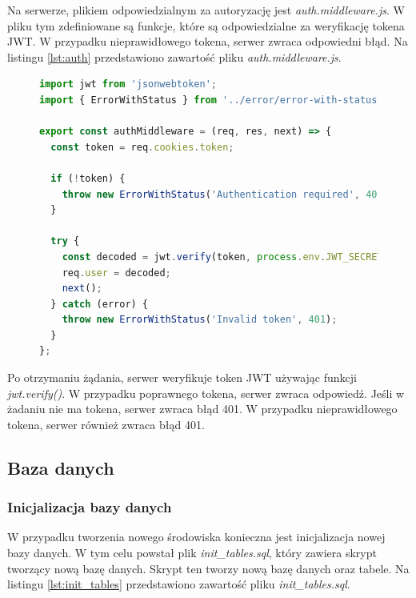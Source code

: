 Na serwerze, plikiem odpowiedzialnym za autoryzację jest \textit{auth.middleware.js}. W pliku tym zdefiniowane są funkcje, które są odpowiedzialne za weryfikację tokena JWT. W przypadku nieprawidłowego tokena, serwer zwraca odpowiedni błąd. Na listingu \ref{lst:auth} przedstawiono zawartość pliku \textit{auth.middleware.js}.

\begin{figure}[H]
\begin{lstlisting}[language=JavaScript, caption=Przykładowa definicja autoryzacji, label=lst:auth]
import jwt from 'jsonwebtoken';
import { ErrorWithStatus } from '../error/error-with-status.js';

export const authMiddleware = (req, res, next) => {
  const token = req.cookies.token;

  if (!token) {
    throw new ErrorWithStatus('Authentication required', 401);
  }

  try {
    const decoded = jwt.verify(token, process.env.JWT_SECRET);
    req.user = decoded;
    next();
  } catch (error) {
    throw new ErrorWithStatus('Invalid token', 401);
  }
};
\end{lstlisting}
\end{figure}

Po otrzymaniu żądania, serwer weryfikuje token JWT używając funkcji \textit{jwt.verify()}. W przypadku poprawnego tokena, serwer zwraca odpowiedź. Jeśli w żadaniu nie ma tokena, serwer zwraca błąd 401. W przypadku nieprawidłowego tokena, serwer również zwraca błąd 401.

\subsection{Baza danych}

\subsubsection{Inicjalizacja bazy danych}

W przypadku tworzenia nowego środowiska konieczna jest inicjalizacja nowej bazy danych. W tym celu powstał plik \textit{init\_tables.sql}, który zawiera skrypt tworzący nową bazę danych. Skrypt ten tworzy nową bazę danych oraz tabele. Na listingu \ref{lst:init_tables} przedstawiono zawartość pliku \textit{init\_tables.sql}.

